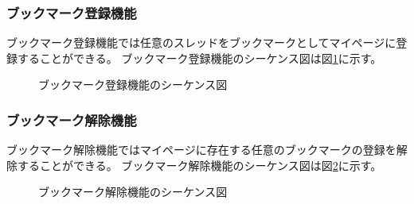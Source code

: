 \documentclass[a4j]{jarticle}
\begin{document}
  \subsubsection{ブックマーク登録機能}
  ブックマーク登録機能では任意のスレッドをブックマークとしてマイページに登録することができる。
  ブックマーク登録機能のシーケンス図は図\ref{fig:bookmark_register.png}に示す。
  \begin{figure}[H]
    \centering
    \caption{ブックマーク登録機能のシーケンス図}
    \label{fig:bookmark_register.png}
  \end{figure}



  \subsubsection{ブックマーク解除機能}
  ブックマーク解除機能ではマイページに存在する任意のブックマークの登録を解除することができる。
  ブックマーク解除機能のシーケンス図は図\ref{fig:bookmark_release.png}に示す。
  \begin{figure}[H]
    \centering
    \caption{ブックマーク解除機能のシーケンス図}
    \label{fig:bookmark_release.png}
  \end{figure}
\end{document}
